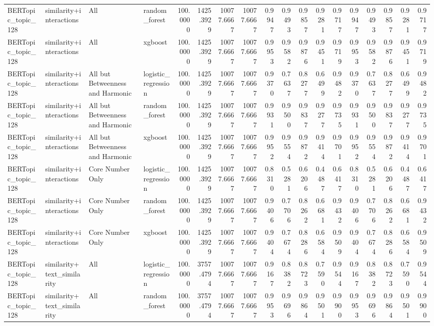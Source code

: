 \begin{tabular}{llllrrrrrrrrrrrrrr}
BERTopic_topic_128 & similarity+interactions & All & random_forest & 100.0000 & 1425.3929 & 10077.6667 & 10077.6667 & 0.9947 & 0.9493 & 0.9857 & 0.9281 & 0.9717 & 0.9947 & 0.9493 & 0.9857 & 0.9281 & 0.9717 \\
BERTopic_topic_128 & similarity+interactions & All & xgboost & 100.0000 & 1425.3929 & 10077.6667 & 10077.6667 & 0.9953 & 0.9582 & 0.9876 & 0.9451 & 0.9719 & 0.9953 & 0.9582 & 0.9876 & 0.9451 & 0.9719 \\
BERTopic_topic_128 & similarity+interactions & All but Betweenness and Harmonic & logistic_regression & 100.0000 & 1425.3929 & 10077.6667 & 10077.6667 & 0.9370 & 0.7637 & 0.8277 & 0.6499 & 0.9482 & 0.9370 & 0.7637 & 0.8277 & 0.6499 & 0.9482 \\
BERTopic_topic_128 & similarity+interactions & All but Betweenness and Harmonic & random_forest & 100.0000 & 1425.3929 & 10077.6667 & 10077.6667 & 0.9931 & 0.9500 & 0.9837 & 0.9277 & 0.9735 & 0.9931 & 0.9500 & 0.9837 & 0.9277 & 0.9735 \\
BERTopic_topic_128 & similarity+interactions & All but Betweenness and Harmonic & xgboost & 100.0000 & 1425.3929 & 10077.6667 & 10077.6667 & 0.9952 & 0.9554 & 0.9872 & 0.9414 & 0.9701 & 0.9952 & 0.9554 & 0.9872 & 0.9414 & 0.9701 \\
BERTopic_topic_128 & similarity+interactions & Core Number Only & logistic_regression & 100.0000 & 1425.3929 & 10077.6667 & 10077.6667 & 0.8310 & 0.5281 & 0.6206 & 0.4487 & 0.6417 & 0.8310 & 0.5281 & 0.6206 & 0.4487 & 0.6417 \\
BERTopic_topic_128 & similarity+interactions & Core Number Only & random_forest & 100.0000 & 1425.3929 & 10077.6667 & 10077.6667 & 0.9406 & 0.7706 & 0.8262 & 0.6681 & 0.9432 & 0.9406 & 0.7706 & 0.8262 & 0.6681 & 0.9432 \\
BERTopic_topic_128 & similarity+interactions & Core Number Only & xgboost & 100.0000 & 1425.3929 & 10077.6667 & 10077.6667 & 0.9404 & 0.7674 & 0.8286 & 0.6584 & 0.9509 & 0.9404 & 0.7674 & 0.8286 & 0.6584 & 0.9509 \\
BERTopic_topic_128 & similarity+text_similarity & All & logistic_regression & 100.0000 & 3757.4794 & 10077.6667 & 10077.6667 & 0.9167 & 0.8382 & 0.8723 & 0.7590 & 0.9544 & 0.9167 & 0.8382 & 0.8723 & 0.7590 & 0.9544 \\
BERTopic_topic_128 & similarity+text_similarity & All & random_forest & 100.0000 & 3757.4794 & 10077.6667 & 10077.6667 & 0.9953 & 0.9696 & 0.9864 & 0.9501 & 0.9900 & 0.9953 & 0.9696 & 0.9864 & 0.9501 & 0.9900 \\

\end{tabular}
